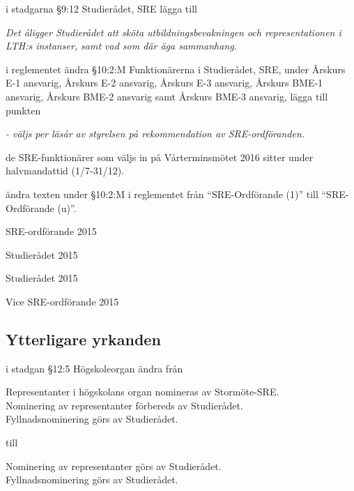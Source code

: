 \documentclass[../_main/handlingar.tex]{subfiles}
\begin{document}
\begin{attsatser}
  \att i stadgarna \S9:12 Studierådet, SRE lägga till\par
  \emph{Det åligger Studierådet att sköta utbildningsbevakningen och representationen i LTH:s instanser, samt vad som där äga sammanhang.}

  \newpage
  \att i reglementet ändra \S10:2:M Funktionärerna i Studierådet, SRE, under Årskurs E-1 ansvarig, Årskurs E-2 ansvarig, Årskurs E-3 ansvarig, Årskurs BME-1 ansvarig, Årskurs BME-2 ansvarig samt Årskurs BME-3 ansvarig, lägga till punkten\par
  \emph{- väljs per läsår av styrelsen på rekommendation av SRE-ordföranden.}

  \att de SRE-funktionärer som väljs in på Vårterminsmötet 2016 sitter under halvmandattid (1/7-31/12).

  \att ändra texten under \S10:2:M i reglementet från ``SRE-Ordförande (1)'' till ``SRE-Ordförande (u)''.
\end{attsatser}

\begin{signatures}{4}
    \mvh
    \signature{Sofia Karlén}{SRE-ordförande 2015}
    \signature{Fredrik Peterson}{Studierådet 2015}
    \signature{Johan Persson}{Studierådet 2015}
    \signature{Molly Rusk}{Vice SRE-ordförande 2015}
\end{signatures}

\subsection*{Ytterligare yrkanden}

\begin{attsatser}
    \att i stadgan \S12:5 Högskoleorgan ändra från\par
    \begin{itshape}
      Representanter i högskolans organ nomineras av Stormöte-SRE.\\
      Nominering av representanter förbereds av Studierådet.\\
      Fyllnadsnominering görs av Studierådet.
    \end{itshape}\par
    till\par
    \begin{itshape}
      Nominering av representanter görs av Studierådet.\\
      Fyllnadsnominering görs av Studierådet.
    \end{itshape}
\end{attsatser}
\end{document}
